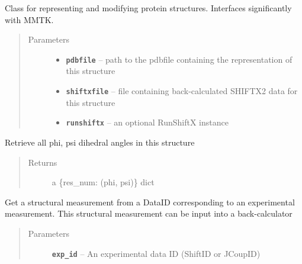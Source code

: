 \documentclass[letterpaper,10pt,english]{sphinxmanual}
\begin{document}
\begin{fulllineitems}
\label{modules:structure.Structure}
Class for representing and modifying protein structures. Interfaces
significantly with MMTK.
\begin{quote}\begin{description}
\item[{Parameters}] \leavevmode\begin{itemize}
\item {} 
\textbf{\texttt{pdbfile}} -- path to the pdbfile containing the representation of this structure

\item {} 
\textbf{\texttt{shiftxfile}} -- file containing back-calculated SHIFTX2 data for this structure

\item {} 
\textbf{\texttt{runshiftx}} -- an optional RunShiftX instance

\end{itemize}

\end{description}\end{quote}

\begin{fulllineitems}
\label{modules:structure.Structure._get_all_dihed}
Retrieve all phi, psi dihedral angles in this structure
\begin{quote}\begin{description}
\item[{Returns}] \leavevmode
a \{res\_num: (phi, psi)\} dict

\end{description}\end{quote}

\end{fulllineitems}


\begin{fulllineitems}
\label{modules:structure.Structure.get_struct_measure}
Get a structural measurement from a DataID corresponding to an
experimental measurement. This structural measurement can be
input into a back-calculator
\begin{quote}\begin{description}
\item[{Parameters}] \leavevmode
\textbf{\texttt{exp\_id}} -- An experimental data ID (ShiftID or JCoupID)

\end{description}\end{quote}

\end{fulllineitems}


\end{fulllineitems}
\end{document}
